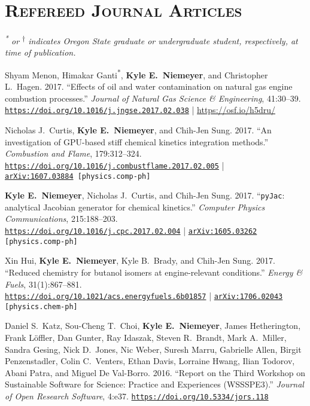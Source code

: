 \documentclass[margin,line,11pt]{res}
\makeatletter
\newlength{\bibhang}
\newlength{\bibsep}
 {\@listi \global\bibsep\itemsep \global\advance\bibsep by\parsep}
\newenvironment{bibenum*}
  {\renewcommand\labelenumi{\theenumi.}%
   \etaremune[
     topsep=0pt,
     itemsep=\bibsep,
     parsep=0pt,partopsep=0pt,
     itemindent=-\bibhang,
     leftmargin={\bibhang+\widthof{[999]}}]}
  {\endetaremune}
\newcommand*{\doi}[1]{\href{https://doi.org/#1}{\nolinkurl{https://doi.org/#1}}}
\newcommand*{\grad}[0]{\textsuperscript{*}}
\newcommand*{\ugrad}[0]{\textsuperscript{$\dagger$}}
\makeatother
\begin{document}
\begin{resume}
\begin{bibenum*}
\end{bibenum*}

\section{\textsc{Refereed Journal Articles}}

\textit{\grad{} or \ugrad{} indicates Oregon State
graduate or undergraduate student, respectively, at time of publication.}
\\

\begin{bibenum*}

\item Shyam Menon, Himakar Ganti\textsuperscript{*}, \textbf{Kyle E.~Niemeyer}, and Christopher L.~Hagen.
2017.
``Effects of oil and water contamination on natural gas engine combustion processes.''
\textit{Journal of Natural Gas Science \& Engineering}, 41:30--39.
\doi{10.1016/j.jngse.2017.02.038} | \url{https://osf.io/h5dru/}

\item Nicholas J.~Curtis, \textbf{Kyle E.~Niemeyer}, and Chih-Jen Sung.
2017.
``An investigation of GPU-based stiff chemical kinetics integration methods.''
\textit{Combustion and Flame}, 179:312--324.
\doi{10.1016/j.combustflame.2017.02.005} | \\
{\tt \href{http://arxiv.org/abs/1607.03884}{arXiv:1607.03884} [physics.comp-ph]}

\item \textbf{Kyle E.~Niemeyer}, Nicholas J.~Curtis, and Chih-Jen Sung.
2017.
``\texttt{pyJac}: analytical Jacobian generator for chemical kinetics.''
\textit{Computer Physics Communications}, 215:188--203. \\
\doi{10.1016/j.cpc.2017.02.004} |
{\tt \href{http://arxiv.org/abs/1605.03262}{arXiv:1605.03262} [physics.comp-ph]}

\item Xin Hui, \textbf{Kyle E.~Niemeyer}, Kyle B.~Brady, and Chih-Jen Sung.
2017.
``Reduced chemistry for butanol isomers at engine-relevant conditions.''
\textit{Energy \& Fuels}, 31(1):867--881. \\
\doi{10.1021/acs.energyfuels.6b01857} |
{\tt \href{https://arxiv.org/abs/1706.02043}{arXiv:1706.02043} [physics.chem-ph]}

\item Daniel S.~Katz, Sou-Cheng T.\ Choi, \textbf{Kyle E.~Niemeyer}, James Hetherington,
Frank L\"{o}ffler, Dan Gunter, Ray Idaszak, Steven R.\ Brandt, Mark A.\ Miller, Sandra Gesing,
Nick D.\ Jones, Nic Weber, Suresh Marru, Gabrielle Allen, Birgit Penzenstadler, Colin C.\ Venters,
Ethan Davis, Lorraine Hwang, Ilian Todorov, Abani Patra, and Miguel De Val-Borro.
2016.
``Report on the Third Workshop on Sustainable Software for Science: Practice and Experiences (WSSSPE3).''
\emph{Journal of Open Research Software}, 4:e37.
\doi{10.5334/jors.118}


\end{bibenum*}
\end{resume}
\end{document}
